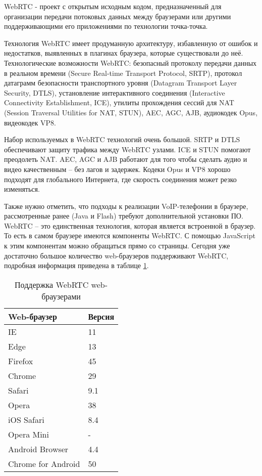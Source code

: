 WebRTC - проект с открытым исходным кодом, предназначенный для организации передачи потоковых данных между браузерами или другими поддерживающими его приложениями по технологии точка-точка.\cite{WebRTC}

Технология WebRTC имеет продуманную архитектуру, избавленную от ошибок и недостатков, выявленных в плагинах браузера, которые существовали до неё. Технологические возможности WebRTC: безопасный протоколу передачи данных в реальном времени (Secure Real-time Transport Protocol, SRTP), протокол датаграмм безопасности транспортного уровня (Datagram Transport Layer Security, DTLS), установление интерактивного соединения (Interactive Connectivity Establishment, ICE), утилиты прохождения сессий для NAT (Session Traversal Utilities for NAT, STUN), AEC, AGC, AJB, аудиокодек Opus, видеокодек VP8.

Набор используемых в WebRTC технологий очень большой. SRTP и DTLS обеспечивают защиту трафика между WebRTC узлами. ICE и STUN помогают преодолеть NAT.\cite{sip_nat} AEC, AGC и AJB работают для того чтобы сделать аудио и видео качественным – без лагов и задержек. Кодеки Opus и VP8 хорошо подходят для глобального Интернета, где скорость соединения может резко изменяться.

Также нужно отметить, что подходы к реализации VoIP-телефонии в браузере, рассмотренные ранее (Java и Flash) требуют дополнительной установки ПО. WebRTC – это единственная технология, которая является встроенной в браузер. То есть в самом браузере имеются компоненты WebRTC. С помощью JavaScript к этим компонентам можно обращаться прямо со страницы. Сегодня уже достаточно большое количество web-браузеров поддерживают WebRTC, подробная информация приведена в таблице \ref{table:browsers}.\cite{browsers_url}

\begin{table}
    \caption{Поддержка WebRTC web-браузерами}
    \begin{center}
    \begin{tabular}{|l|l|}
    \hline
    \textbf{Web-браузер} & \textbf{Версия}\\
    \hline
    IE & 11 \\
    \hline
    Edge & 13 \\
    \hline
    Firefox & 45 \\
    \hline
    Chrome & 29 \\
    \hline
    Safari & 9.1 \\
    \hline
    Opera & 38 \\
    \hline
    iOS Safari & 8.4 \\
    \hline
    Opera Mini & - \\
    \hline
    Android Browser & 4.4 \\
    \hline
    Chrome for Android & 50 \\
    \hline
    \end{tabular}
    \end{center}
    \label{table:browsers}
\end{table}


